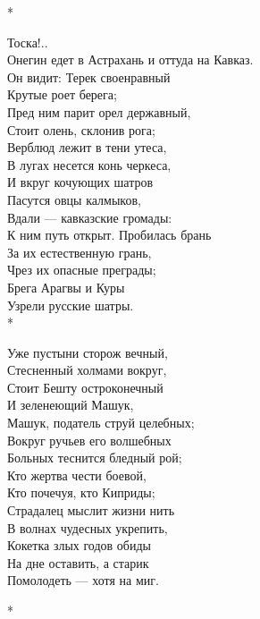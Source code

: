 *

Тоска!..\\
Онегин едет в Астрахань и оттуда на Кавказ.\\
Он видит: Терек своенравный\\
Крутые роет берега;\\
Пред ним парит орел державный,\\
Стоит олень, склонив рога;\\
Верблюд лежит в тени утеса,\\
В лугах несется конь черкеса,\\
И вкруг кочующих шатров\\
Пасутся овцы калмыков,\\
Вдали — кавказские громады:\\
К ним путь открыт. Пробилась брань\\
За их естественную грань,\\
Чрез их опасные преграды;\\
Брега Арагвы и Куры\\
Узрели русские шатры.\\

*

Уже пустыни сторож вечный,\\
Стесненный холмами вокруг,\\
Стоит Бешту остроконечный\\
И зеленеющий Машук,\\
Машук, податель струй целебных;\\
Вокруг ручьев его волшебных\\
Больных теснится бледный рой;\\
Кто жертва чести боевой,\\
Кто почечуя, кто Киприды;\\
Страдалец мыслит жизни нить\\
В волнах чудесных укрепить,\\
Кокетка злых годов обиды\\
На дне оставить, а старик\\
Помолодеть — хотя на миг.

*

